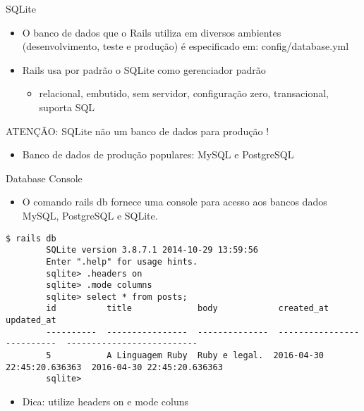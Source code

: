 \begin{frame}{SQLite}
	\begin{itemize}
		\item O banco de dados que o Rails utiliza em diversos ambientes (desenvolvimento,
		teste e produção) é especificado em: \alert{config/database.yml}
	\end{itemize}
	
	
	
	\begin{itemize}
		\item Rails usa por padrão o SQLite como gerenciador padrão
		\begin{itemize}
			\item relacional, embutido, sem servidor, configuração zero,
			transacional, suporta SQL
		\end{itemize}
	\end{itemize}
	
	\begin{center}
		\alert{{\huge ATENÇÃO: SQLite não um banco de dados para produção !}}
	\end{center}
	
	\begin{itemize}
		\item Banco de dados de produção populares: \alert{MySQL} e \alert{PostgreSQL}
	\end{itemize}
\end{frame}

\begin{frame}[t, fragile]{Database Console}
	\begin{itemize}
		\item O comando \alert{rails db} fornece uma console para acesso aos bancos dados
		MySQL, PostgreSQL e SQLite.
	\end{itemize}
	
	\begin{lstlisting}[style=BashInputBasicStyle, basicstyle=\tiny\ttfamily,  keepspaces=true]
		$ rails db
		SQLite version 3.8.7.1 2014-10-29 13:59:56
		Enter ".help" for usage hints.
		sqlite> .headers on
		sqlite> .mode columns
		sqlite> select * from posts;
		id          title             body            created_at                  updated_at                
		----------  ----------------  --------------  --------------------------  --------------------------
		5           A Linguagem Ruby  Ruby e legal.  2016-04-30 22:45:20.636363  2016-04-30 22:45:20.636363
		sqlite> 
	\end{lstlisting}
	
	\begin{itemize}
		\item Dica: utilize \alert{headers on} e \alert{mode coluns}
	\end{itemize}
	
\end{frame}

